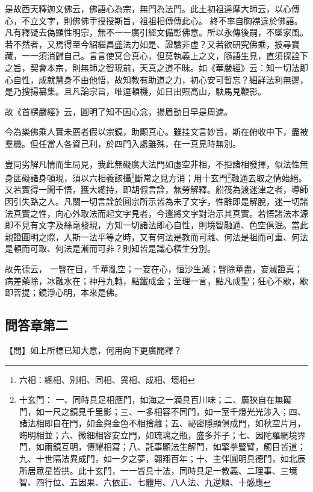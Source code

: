 是故西天釋迦文佛云，{\kaishu 佛語心為宗，無門為法門}。此土初祖達摩大師云，{\kaishu 以心傳心，不立文字}，則佛佛手授授斯旨，祖祖相傳傳此心。
終不率自胸襟違於佛語。凡有釋疑去偽顯性明宗，無不一一廣引經文備彰佛意。所以永傳後嗣，不墜家風。若不然者，又焉得至今紹繼昌盛法力如是、證驗非虛？又若欲研究佛乘，披尋寶藏，一一須消歸自己。言言使冥合真心，但莫執義上之文，隨語生見，直須探詮下之旨，契會本宗，則無師之智現前，天真之道不昧。如《華嚴經》云：{\kaishu 知一切法即心自性}，成就慧身不由他悟，故知教有助道之力，初心安可暫忘？細詳法利無邊，是乃搜揚纂集。且凡論宗旨，唯逗頓機，如日出照高山，駃馬見鞭影。

故《首楞嚴經》云，{\kaishu 圓明了知不因心念，揚眉動目早是周遮}。

今為樂佛乘人實未薦者假以宗鏡，助顯真心。雖挂文言妙旨，斯在俯收中下，盡被羣機。但任當人各資己利，於四門入處雖殊，在一真見時無別。

豈同劣解凡情而生局見，我此無礙廣大法門如虛空非相，不拒諸相發揮，似法性無身匪礙諸身頓現，須以六相義該攝\footnote{ 六相：總相、別相、同相、異相、成相、壞相}斷常之見方消；用十玄門\footnote{ 十玄門：  一、同時具足相應門，如海之一滴具百川味；二、廣狹自在無礙門，如一尺之鏡見千里影；三、一多相容不同門，如一室千燈光光涉入；四、諸法相即自在門，如金與金色不相捨離；五、祕密隱顯俱成門，如秋空片月，晦明相並；六、微細相容安立門，如琉璃之瓶，盛多芥子；七、因陀羅網境界門，如兩鏡互明，傳耀相寫；八、託事顯法生解門，如擎拳豎臂，觸目皆道；九、十世隔法異成門，如一夕之夢，翱翔百年；十、主伴圓明具德門，如北辰所居眾星皆拱。此十玄門，一一皆具十法，同時具足一教義、二理事、三境智、四行位、五因果、六依正、七體用、八人法、九逆順、十感應}融通去取之情始絕。又若實得一聞千悟，獲大總持，即胡假言詮，無勞解釋。船筏為渡迷津之者，導師因引失路之人。凡關一切言詮於圓宗所示皆為未了文字，性離即是解脫，迷一切諸法真實之性，向心外取法而起文字見者，今還將文字對治示其真實。若悟諸法本源即不見有文字及絲毫發現，方知一切諸法即心自性，則境智融通、色空俱泯。當此親證圓明之際，入斯一法平等之時，又有何法是教而可離、何法是祖而可重、何法是頓而可取、何法是漸而可非？則知皆是識心橫生分別。

故先德云， {\kaishu 一瞖在目，千華亂空；一妄在心，恒沙生滅；瞖除華盡，妄滅證真； 病差藥除，冰融水在；神丹九轉，點鐵成金；至理一言，點凡成聖；狂心不歇，歇即菩提；鏡淨心明，本來是佛}。


\subsection{ 問答章第二 }

【問】如上所標已知大意，何用向下更廣開釋？

